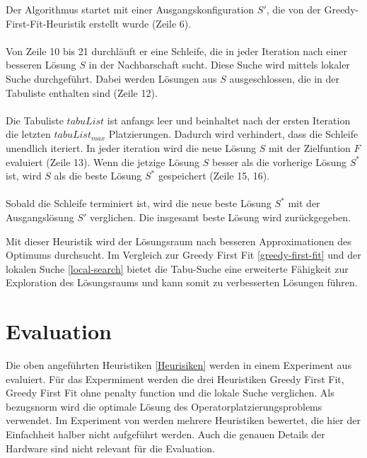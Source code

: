 \documentclass{article}
\begin{document}
Der Algorithmus startet mit einer Ausgangskonfiguration $S'$, die von der Greedy-First-Fit-Heuristik erstellt wurde (Zeile 6). \\ \\
Von Zeile 10 bis 21 durchläuft er eine Schleife, die in jeder Iteration nach einer besseren Lösung $S$ in der Nachbarschaft sucht. 
Diese Suche wird mittels lokaler Suche durchgeführt. Dabei werden Lösungen aus $S$ ausgeschlossen, die in der Tabuliste enthalten sind (Zeile 12). \\ \\
Die Tabuliste $tabuList$ ist anfangs leer und beinhaltet nach der ersten Iteration die letzten $tabuList_{max}$ Platzierungen. 
Dadurch wird verhindert, dass die Schleife unendlich iteriert.
In jeder iteration wird die neue Lösung $S$ mit der Zielfuntion $F$ evaluiert (Zeile 13). %
Wenn die jetzige Lösung $S$ besser als die vorherige Lösung $S^*$ ist, wird $S$ als die beste Lösung $S^*$ gespeichert (Zeile 15, 16). \\ \\

Sobald die Schleife terminiert ist, wird die neue beste Lösung $S^*$ mit der Ausgangslösung $S'$ verglichen. Die insgesamt beste Lösung wird zurückgegeben. 




Mit dieser Heuristik wird der Lösungsraum nach besseren Approximationen des Optimums durchsucht. 
Im Vergleich zur Greedy First Fit \ref{greedy-first-fit} und der 
lokalen Suche \ref{local-search} bietet die Tabu-Suche eine erweiterte Fähigkeit zur Exploration 
des Lösungsraums und kann somit zu verbesserten Lösungen führen.



\section{Evaluation}
Die oben angeführten Heuristiken \ref{Heurisiken} werden in einem Experiment aus \cite{efficient-operator-placement} evaluiert. 
Für das Expermiment werden die drei Heuristiken Greedy First Fit, Greedy First Fit ohne penalty function und die lokale Suche verglichen. 
Als bezugsnorm wird die optimale Lösung des Operatorplatzierungsproblems verwendet. Im Experiment von \cite{efficient-operator-placement} werden mehrere Heuristiken
bewertet, die hier der Einfachheit halber nicht aufgeführt werden. Auch die genauen Details der Hardware sind nicht relevant für die Evaluation. 
\end{document}
